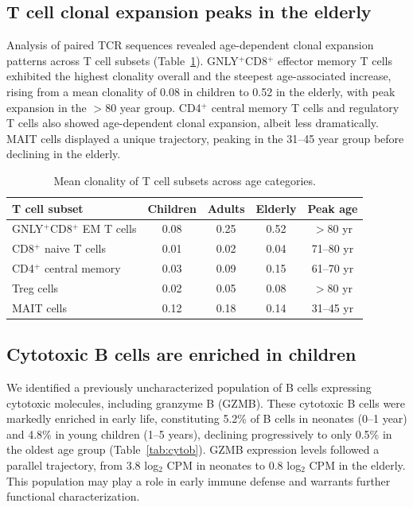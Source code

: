 \documentclass[11pt]{article}
\begin{document}
\subsection{T cell clonal expansion peaks in the elderly}
Analysis of paired TCR sequences revealed age-dependent clonal expansion patterns across T cell subsets (Table~\ref{tab:clonal}). GNLY$^+$CD8$^+$ effector memory T cells exhibited the highest clonality overall and the steepest age-associated increase, rising from a mean clonality of 0.08 in children to 0.52 in the elderly, with peak expansion in the $>$80 year group. CD4$^+$ central memory T cells and regulatory T cells also showed age-dependent clonal expansion, albeit less dramatically. MAIT cells displayed a unique trajectory, peaking in the 31--45 year group before declining in the elderly.

\begin{table}[h]
\centering
\caption{Mean clonality of T cell subsets across age categories.}
\label{tab:clonal}
\begin{tabular}{lcccc}
\toprule
T cell subset & Children & Adults & Elderly & Peak age \\
\midrule
GNLY$^+$CD8$^+$ EM T cells & 0.08 & 0.25 & 0.52 & $>$80 yr \\
CD8$^+$ naive T cells & 0.01 & 0.02 & 0.04 & 71--80 yr \\
CD4$^+$ central memory & 0.03 & 0.09 & 0.15 & 61--70 yr \\
Treg cells & 0.02 & 0.05 & 0.08 & $>$80 yr \\
MAIT cells & 0.12 & 0.18 & 0.14 & 31--45 yr \\
\bottomrule
\end{tabular}
\end{table}

\subsection{Cytotoxic B cells are enriched in children}
We identified a previously uncharacterized population of B cells expressing cytotoxic molecules, including granzyme B (GZMB). These cytotoxic B cells were markedly enriched in early life, constituting 5.2\% of B cells in neonates (0--1 year) and 4.8\% in young children (1--5 years), declining progressively to only 0.5\% in the oldest age group (Table~\ref{tab:cytob}). GZMB expression levels followed a parallel trajectory, from 3.8 log$_2$ CPM in neonates to 0.8 log$_2$ CPM in the elderly. This population may play a role in early immune defense and warrants further functional characterization.
\end{document}
